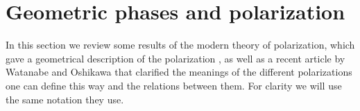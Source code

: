\documentclass[twocolumn,amsmath,longbibliography,amssymb,superscriptaddress]{revtex4-1}
\begin{document}
\section{Geometric phases and polarization}

In this section we review some results of the modern theory of polarization, which gave a geometrical description of the polarization \cite{Resta1992,KingSmith1993,Vanderbilt1993,Resta1997} , as well as a recent article by Watanabe and Oshikawa \cite{Watanabe2018} that clarified the meanings of the different polarizations one can define this way and the relations between them. For clarity we will use the same notation they use. 
\end{document}
